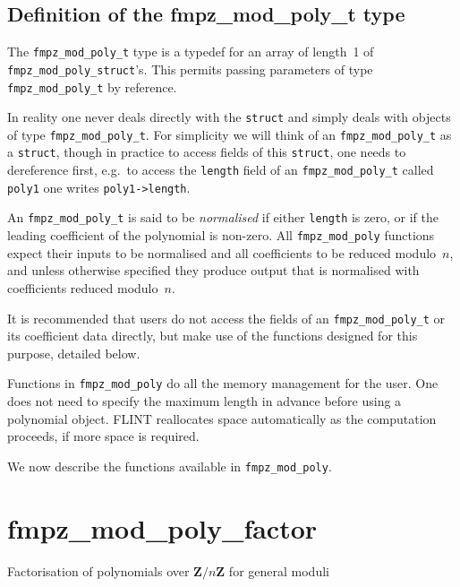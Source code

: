 \documentclass[a4paper,10pt]{book}
\newcommand{\Z}{\mathbf{Z}}%
\newcommand{\code}{\lstinline}
\begin{document}
{{\section{Definition of the fmpz\_mod\_poly\_t type}

The \code{fmpz_mod_poly_t} type is a typedef for an array of length~1 of\\
\code{fmpz_mod_poly_struct}'s.  This permits passing parameters of type
\code{fmpz_mod_poly_t} by reference.

In reality one never deals directly with the \code{struct} and simply deals
with objects of type \code{fmpz_mod_poly_t}.  For simplicity we will think of an
\code{fmpz_mod_poly_t} as a \code{struct}, though in practice to access fields
of this \code{struct}, one needs to dereference first, e.g.\ to access the
\code{length} field of an \code{fmpz_mod_poly_t} called \code{poly1} one writes
\code{poly1->length}.

An \code{fmpz_mod_poly_t} is said to be \emph{normalised} if either
\code{length} is zero, or if the leading coefficient of the polynomial is
non-zero.  All \code{fmpz_mod_poly} functions expect their inputs to be
normalised and all coefficients to be reduced modulo~$n$, and unless
otherwise specified they produce output that is normalised with coefficients
reduced modulo~$n$.

It is recommended that users do not access the fields of an
\code{fmpz_mod_poly_t} or its coefficient data directly, but make use of the
functions designed for this purpose, detailed below.

Functions in \code{fmpz_mod_poly} do all the memory management for the user.
One does not need to specify the maximum length in advance before using a
polynomial object.  FLINT reallocates space automatically as the computation
proceeds, if more space is required.

We now describe the functions available in \code{fmpz_mod_poly}.




\chapter{fmpz\_mod\_poly\_factor}
\epigraph{Factorisation of polynomials over $\Z/n\Z$ for general moduli}{}

}}
\end{document}
